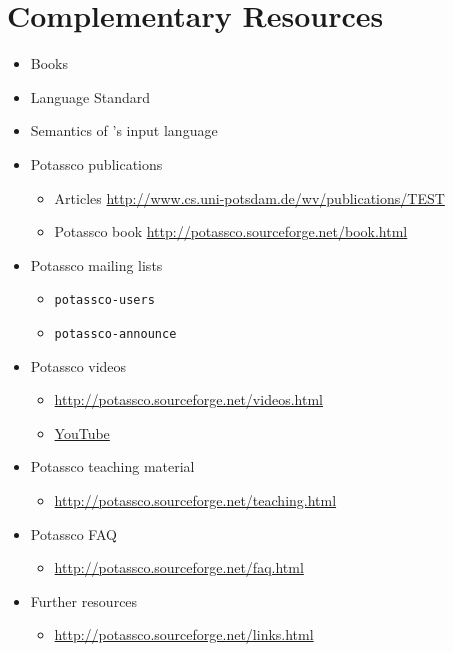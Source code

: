 
\section{Complementary Resources}
\label{sec:resources}
\tbr
\begin{itemize}
\item Books \cite{baral03a,gekakasc12a,gelkah14a}
\item Language Standard \cite{aspcore2}
\item Semantics of \gringo's input language \cite{haliya14a,gehakalisc14a}
\item Potassco publications
  \begin{itemize}
  \item Articles \url{http://www.cs.uni-potsdam.de/wv/publications/TEST}
  \item Potassco book \url{http://potassco.sourceforge.net/book.html}
  \end{itemize}
\item Potassco mailing lists
  \begin{itemize}
  \item \texttt{potassco-users}
  \item \texttt{potassco-announce}
  \end{itemize}
\item Potassco videos
  \begin{itemize}
  \item \url{http://potassco.sourceforge.net/videos.html}
  \item \url{YouTube}
  \end{itemize}
\item Potassco teaching material
  \begin{itemize}
  \item \url{http://potassco.sourceforge.net/teaching.html}
  \end{itemize}
\item Potassco FAQ
  \begin{itemize}
  \item \url{http://potassco.sourceforge.net/faq.html}
  \end{itemize}
\item Further resources
  \begin{itemize}
  \item \url{http://potassco.sourceforge.net/links.html}
  \end{itemize}
\end{itemize}

